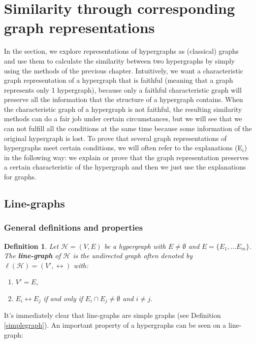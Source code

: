 \documentclass[a4paper,11pt]{report}
\newtheorem{definition}[theorem]{Definition}
\newcommand{\hgrafeen}{\mathcal{H}}
\begin{document}
\section{Similarity through corresponding graph representations}
In the section, we explore representations of hypergraphs as (classical) graphs and use 
them to calculate the similarity between two hypergraphs by simply using the 
methods of the previous chapter. Intuitively, we want a characteristic graph
representation of a hypergraph that is faithful (meaning that a graph represents
only 1 hypergraph), because only a faithful
characteristic graph will preserve all the information that the structure of a hypergraph
contains. When the characteristic graph of a hypergraph is not faithful,
the resulting similarity methods 
can do a fair job under certain circumstances, but we will see that we can not fulfill
all the conditions at the same time because some information of the original hypergraph is lost. 
To prove that several graph representations of hypergraphs meet certain 
conditions, we will often refer to the explanations (E$_i$) in the following 
way: we explain or prove that the graph representation preserves a certain 
characteristic of the hypergraph and then we just use the explanations for 
graphs. 

\subsection{Line-graphs}
\subsubsection{General definitions and properties}
\begin{definition}\label{linegraphdef}
  Let $\hgrafeen = (V,E)$ be a hypergraph with $E \not = \emptyset$ and $E = \{E_1, \ldots E_m\}$. The \textbf{line-graph} of $\hgrafeen$ is the undirected graph 
  often denoted by $\ell(\hgrafeen) = (V', \leftrightarrow)$ 
with:
  \begin{enumerate}
    \item $V' = E$,
    \item $E_i \leftrightarrow E_j$ if and only if $E_i \cap E_j \not = \emptyset$ and $i \not = j$.
      \end{enumerate}
\end{definition}

It's immediately clear that line-graphs are simple graphs (see Definition \ref{simplegraph}). 
An important property of a hypergraphs can be seen on a line-graph:
\end{document}
